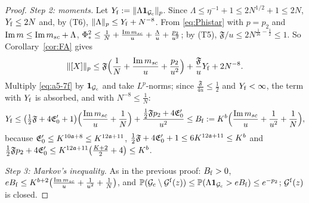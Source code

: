 \begin{proof}
\emph{Step 2: moments.} Let $Y_{\rm f}:=\|\Lambda\mathbf{1}_{\mathcal{G}_{\rm c}}\|_p$. Since $\Lambda\le\eta^{-1}+1\le2N^{1/2}+1\le2N$, $Y_{\rm f}\le2N$ and, by (T6), $\|\Lambda\|_p\le Y_{\rm f}+N^{-8}$. From \eqref{eq:Phistar} with $p=p_2$ and $\operatorname{Im} m\le\operatorname{Im}m_{sc}+\Lambda$,
$\Phi_*^2\le\frac1N+\frac{\operatorname{Im}m_{sc}}{u}+\frac{\Lambda}{u}+\frac{p_2}{u^2}$; by (T5), $\mathfrak F/u\le2N^{\frac1{16}-\frac12}\le1$. So Corollary~\ref{cor:FA} gives
\[
 \|[X]\|_p\le\mathfrak F\Big(\frac1N+\frac{\operatorname{Im}m_{sc}}{u}+\frac{p_2}{u^2}\Big)+\frac{\mathfrak F}{u}Y_{\rm f}+2N^{-8}.
\]
Multiply \eqref{eq:a5-7f} by $\mathbf{1}_{\mathcal{G}_{\rm c}}$ and take $L^p$-norms; since $\frac{\mathfrak F}{4u}\le\frac12$ and $Y_{\rm f}<\infty$, the term with $Y_{\rm f}$ is absorbed, and with $N^{-8}\le\frac1N$:
\[
 Y_{\rm f}\le\big(\tfrac12\mathfrak F+4\mathfrak E_0'+1\big)\Big(\frac{\operatorname{Im}m_{sc}}{u}+\frac1N\Big)+\frac{\frac12\mathfrak Fp_2+4\mathfrak E_0'}{u^2}\le B_{\rm f}:=K^{b}\Big(\frac{\operatorname{Im}m_{sc}}{u}+\frac1{u^2}+\frac1N\Big),
\]
because $\mathfrak E_0'\le K^{10\mathfrak{a}+8}\le K^{12\mathfrak{a}+11}$, $\frac12\mathfrak F+4\mathfrak E_0'+1\le6K^{12\mathfrak{a}+11}\le K^b$ and $\frac12\mathfrak Fp_2+4\mathfrak E_0'\le K^{12\mathfrak{a}+11}\big(\frac{K+2}2+4\big)\le K^b$.

\emph{Step 3: Markov's inequality.} As in the previous proof: $B_{\rm f}>0$, $eB_{\rm f}\le K^{b+2}\big(\frac{\operatorname{Im}m_{sc}}{u}+\frac1{u^2}+\frac1N\big)$, and $\mathbb{P}(\mathcal{G}_{\rm c}\setminus\mathcal{G}^{\rm f}(z))\le\mathbb{P}(\Lambda\mathbf{1}_{\mathcal{G}_{\rm c}}>eB_{\rm f})\le e^{-p_2}$; $\mathcal{G}^{\rm f}(z)$ is closed.
\end{proof}

